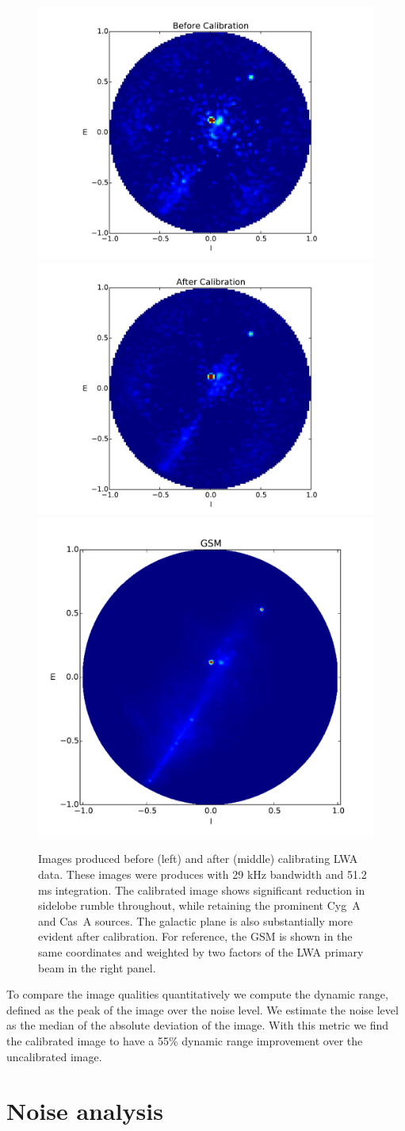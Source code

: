 \documentclass[a4paper,fleqn,usenatbib]{../mnras}
\begin{document}
\begin{figure}
\begin{center}
\includegraphics[width=0.33\linewidth]{figures/cal_paper_data_image_before.pdf}
\includegraphics[width=0.33\linewidth]{figures/cal_paper_data_image_after.pdf}
\includegraphics[width=0.33\linewidth]{figures/cal_paper_gsm_beam_weighted.pdf}
\caption{Images produced before (left) and after (middle) calibrating LWA data. These images were produces with 29 kHz bandwidth and 51.2 ms integration. The calibrated image shows significant reduction in sidelobe rumble throughout, while retaining the prominent Cyg~A and Cas~A sources. The galactic plane is also substantially more evident after calibration. For reference, the GSM is shown in the same coordinates and weighted by two factors of the LWA primary beam in the right panel.
}
\label{fig:data_images}
\end{center}
\end{figure}

To compare the image qualities quantitatively we compute the dynamic range, defined as the peak of the image over the noise level. We estimate the noise level as the median of the absolute deviation of the image. With this metric we find the calibrated image to have a 55\% dynamic range improvement over the uncalibrated image.

\section{Noise analysis}\label{sec:noise}
\end{document}

